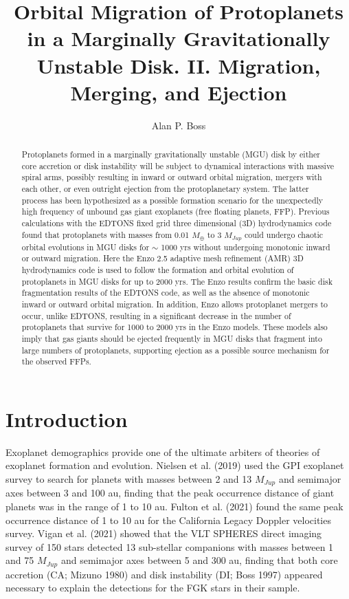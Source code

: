 \documentclass[12pt,preprint]{aastex}
\begin{document}
\title{Orbital Migration of Protoplanets in a Marginally Gravitationally Unstable Disk. II. Migration, Merging, and Ejection}

\author{Alan P. Boss}

\begin{abstract}

 Protoplanets formed in a marginally gravitationally unstable (MGU) disk by either core accretion or disk instability will
be subject to dynamical interactions with massive spiral arms, possibly resulting in inward or outward
orbital migration, mergers with each other, or even outright ejection from the protoplanetary system. The latter
process has been hypothesized as a possible formation scenario for the unexpectedly high frequency of
unbound gas giant exoplanets (free floating planets, FFP). Previous calculations with the EDTONS fixed grid
three dimensional (3D) hydrodynamics code found that protoplanets with masses from 0.01 $M_\oplus$ to 3 $M_{Jup}$
could undergo chaotic orbital evolutions in MGU disks for $\sim$ 1000 yrs without undergoing monotonic inward or
outward migration. Here the Enzo 2.5 adaptive mesh refinement (AMR) 3D hydrodynamics code
is used to follow the formation and orbital evolution of protoplanets in MGU disks for up to 2000 yrs. 
The Enzo results confirm the basic disk fragmentation results of the EDTONS code, as well as the absence of
monotonic inward or outward orbital migration. In addition, Enzo allows protoplanet mergers to occur, unlike 
EDTONS, resulting in a significant decrease in the number of protoplanets that survive for 1000 to 2000 yrs in the 
Enzo models. These models also imply that gas giants should be ejected frequently in MGU disks that fragment
into large numbers of protoplanets, supporting ejection as a possible source mechanism for the observed FFPs. 
 
\end{abstract}


\section{Introduction}

 Exoplanet demographics provide one of the ultimate arbiters of theories of exoplanet formation and evolution.
Nielsen et al. (2019) used the GPI exoplanet survey to search for planets with masses between
2 and 13 $M_{Jup}$ and semimajor axes between 3 and 100 au, finding that the peak occurrence distance
of giant planets was in the range of 1 to 10 au. Fulton et al. (2021) found the same peak occurrence 
distance of 1 to 10 au for the California Legacy Doppler velocities survey. Vigan et al. (2021) 
showed that the VLT SPHERES direct imaging survey of 150 stars detected 13 sub-stellar
companions with masses between 1 and 75 $M_{Jup}$ and semimajor axes between 5 and 300 au,
finding that both core accretion (CA; Mizuno 1980) and disk instability (DI; Boss 1997) 
appeared necessary to explain the detections for the FGK stars in their sample. 
\end{document}
